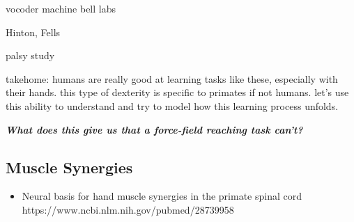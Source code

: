 {            vocoder machine bell labs

            Hinton, Fells

            palsy study

            takehome: humans are really good at learning tasks like
            these, especially with their hands. this type of dexterity
            is specific to primates if not humans. let's use this
            ability to understand and try to model how this learning
            process unfolds.

            \textbf{\emph{What does this give us that a force-field
            reaching task can't?}}

            \hypertarget{muscle-synergies}{%
            \subsection{Muscle Synergies}\label{muscle-synergies}}

            \begin{itemize}
            \tightlist
            \item
              Neural basis for hand muscle synergies in the primate
              spinal cord https://www.ncbi.nlm.nih.gov/pubmed/28739958
            \end{itemize}

}
